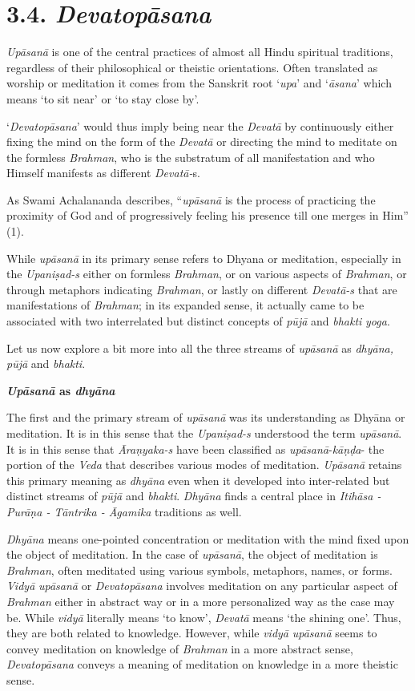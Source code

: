 \section*{3.4. \emph{Devatopāsana}}

\emph{Upāsanā} is one of the central practices of almost all Hindu spiritual traditions, regardless of their philosophical or theistic orientations. Often translated as worship or meditation it comes from the Sanskrit root `\emph{upa}' and `\emph{āsana}' which means `to sit near' or `to stay close by'.

`\emph{Devatopāsana}' would thus imply being near the \emph{Devatā} by continuously either fixing the mind on the form of the \emph{Devatā} or directing the mind to meditate on the formless \emph{Brahman}, who is the substratum of all manifestation and who Himself manifests as different \emph{Devatā-}s.

As Swami Achalananda describes, ``\emph{upāsanā} is the process of practicing the proximity of God and of progressively feeling his presence till one merges in Him'' (1).

While \emph{upāsanā} in its primary sense refers to Dhyana or meditation, especially in the \emph{Upaniṣad-s} either on formless \emph{Brahman}, or on various aspects of \emph{Brahman}, or through metaphors indicating \emph{Brahman}, or lastly on different \emph{Devatā-s} that are manifestations of \emph{Brahman}; in its expanded sense, it actually came to be associated with two interrelated but distinct concepts of \emph{pūjā} and \emph{bhakti} \emph{yoga}.

Let us now explore a bit more into all the three streams of \emph{upāsanā} as \emph{dhyāna, pūjā} and \emph{bhakti}.

\textbf{\emph{Upāsanā} as \emph{dhyāna}}

The first and the primary stream of \emph{upāsanā} was its understanding as Dhyāna or meditation. It is in this sense that the \emph{Upaniṣad-s} understood the term \emph{upāsanā}. It is in this sense that \emph{Āraṇyaka-s} have been classified as \emph{upāsanā}-\emph{kāṇḍa}- the portion of the \emph{Veda} that describes various modes of meditation. \emph{Upāsanā} retains this primary meaning as \emph{dhyāna} even when it developed into inter-related but distinct streams of \emph{pūjā} and \emph{bhakti}. \emph{Dhyāna} finds a central place in \emph{Itihāsa - Purāṇa - Tāntrika - Āgamika} traditions as well.

\emph{Dhyāna} means one-pointed concentration or meditation with the mind fixed upon the object of meditation. In the case of \emph{upāsanā}, the object of meditation is \emph{Brahman}, often meditated using various symbols, metaphors, names, or forms. \emph{Vidyā} \emph{upāsanā} or \emph{Devatopāsana} involves meditation on any particular aspect of \emph{Brahman} either in abstract way or in a more personalized way as the case may be. While \emph{vidyā} literally means `to know', \emph{Devatā} means `the shining one'. Thus, they are both related to knowledge. However, while \emph{vidyā} \emph{upāsanā} seems to convey meditation on knowledge of \emph{Brahman} in a more abstract sense, \emph{Devatopāsana} conveys a meaning of meditation on knowledge in a more theistic sense.

